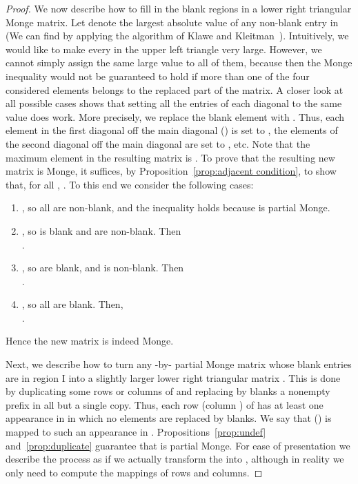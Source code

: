 \documentclass{llncs}
\begin{document}
\begin{proof}
We now describe how to fill in the blank regions in a lower right triangular Monge matrix. Let  denote the largest absolute value of any non-blank entry in  (We can find  by applying the
algorithm of Klawe and Kleitman~\cite{KK89}). 
Intuitively, we would like to make every  in the upper left triangle very large. However,
we cannot simply assign the same large value to all of them, because then the Monge
inequality would not be guaranteed to hold if more than one of the four considered elements
belongs to the replaced part of the matrix. 
A closer look at all possible cases shows that setting all the entries of each diagonal to the same value does work. 
More precisely, we replace the blank element  with . Thus, each element in the first diagonal off the main diagonal () is set to , the elements of the second diagonal off the main diagonal are set to , etc. Note that the maximum element in the resulting matrix is . 
To prove that the resulting new matrix  is Monge, it suffices, by Proposition~\ref{prop:adjacent condition}, to show that, for all ,  .
To this end we consider the following cases:
\begin{enumerate}
\item , so all  are non-blank, and the inequality holds because 
is partial Monge.
\item , so  is blank and  are non-blank. Then\\
.
\item , so  are blank, and  is non-blank. Then\\
.
\item , so all  are blank. Then,\\ 
.
\end{enumerate}
Hence the new matrix  is indeed Monge.

Next, we describe how to turn any -by- partial Monge matrix  whose blank entries are in region I into a slightly larger lower right triangular matrix . This is done by duplicating some rows or columns of  and replacing by blanks a nonempty prefix in all but a single copy. Thus, each row  (column ) of  has at least one appearance in  in which no elements are replaced by blanks. We say that  () is mapped to such an appearance in .   Propositions~\ref{prop:undef} and~\ref{prop:duplicate} guarantee that  is partial Monge. 
For ease of presentation we describe the process as if we actually transform the  into , although in reality we only need to compute the mappings of rows and columns. 


\end{proof}
\end{document}
